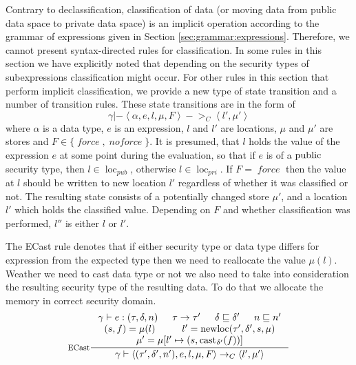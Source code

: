 \documentclass[a4paper, 10pt, draft]{report}
\DeclareMathOperator*{\newloc}{newloc}
\DeclareMathOperator*{\force}{\mathit{force}}
\DeclareMathOperator*{\noforce}{\mathit{noforce}}
\newcommand{\mycode}[1]{\ensuremath{\mbox{\lstinline{#1}}}}
\newcommand{\cast}[1]{\ensuremath{\mycode{cast}_{#1}}}
\begin{document}
Contrary to declassification, classification of data (or moving data from
public data space to private data space) is an implicit operation according
to the grammar of expressions given in Section \ref{sec:grammar:expressions}.
Therefore, we cannot present syntax-directed rules for classification. In some
rules in this section we have explicitly noted that depending on the security
types of subexpressions classification might occur. For other rules in this
section that perform implicit classification, we provide a new type of state
transition and a number of transition rules. These state transitions are in the
form of
\[
  \gamma |- \left\langle
    \alpha, e, l, \mu, F
  \right\rangle ->_C \left\langle
    l', \mu'
  \right\rangle
\]
where $\alpha$ is a data type, $e$ is an expression, $l$ and $l'$ are
locations, $\mu$ and $\mu'$ are stores and $F \in \{\force,\noforce\}$. It is
presumed, that $l$ holds the value of the expression $e$ at some point during
the evaluation, so that if $e$ is of a \mycode{public} security type, then
$l \in \operatorname{loc}_{pub}$, otherwise $l \in \operatorname{loc}_{pri}$.
If $F = \force$ then the
value at $l$ should be written to new location $l'$ regardless of whether it was classified
or not. The resulting state consists of a potentially changed store $\mu'$, and
a location $l'$ which holds the classified value. Depending on $F$ and whether
classification was performed, $l''$ is either $l$ or $l'$.

The ECast rule denotes that if either security type or data type differs for
expression from the expected type then we need to reallocate the value
$\mu(l)$. Weather we need to cast data type or not we also need to take into
consideration the resulting security type of the resulting data. To do that we
allocate the memory in correct security domain.
\[ \inference[ECast]
{
  \gamma |- e : \left(\tau, \delta, n \right)  & \tau \to \tau' & \delta \sqsubseteq \delta' & n \sqsubseteq n' \\ 
  (s, f) = \mu(l) & l' = \newloc(\tau', \delta', s, \mu) \\
  \mu' = \mu [l' \mapsto (s, \cast{\delta'}(f))]
}{
  \gamma |- \left<(\tau', \delta', n'), e, l, \mu, F \right> \to_C \left< l', \mu' \right>
} \]
\end{document}
